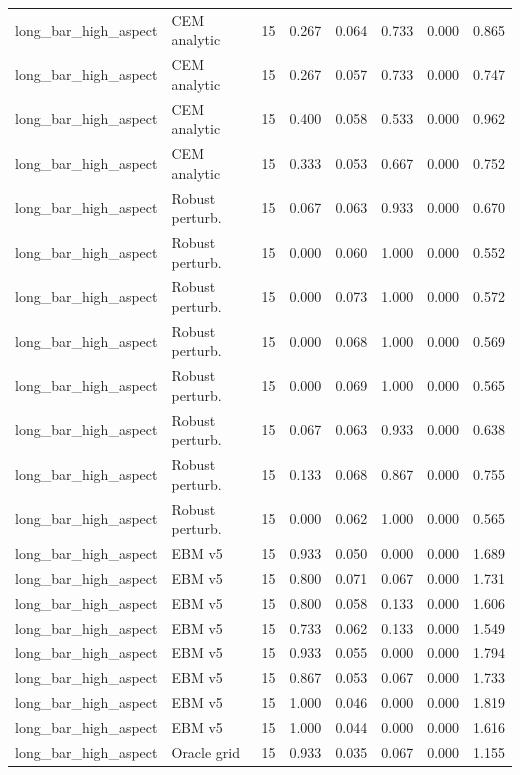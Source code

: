 {\begin{longtable}{llrrrrrr}
long\_bar\_high\_aspect & CEM analytic & 15 & 0.267 & 0.064 & 0.733 & 0.000 & 0.865 \\
long\_bar\_high\_aspect & CEM analytic & 15 & 0.267 & 0.057 & 0.733 & 0.000 & 0.747 \\
long\_bar\_high\_aspect & CEM analytic & 15 & 0.400 & 0.058 & 0.533 & 0.000 & 0.962 \\
long\_bar\_high\_aspect & CEM analytic & 15 & 0.333 & 0.053 & 0.667 & 0.000 & 0.752 \\
long\_bar\_high\_aspect & Robust perturb. & 15 & 0.067 & 0.063 & 0.933 & 0.000 & 0.670 \\
long\_bar\_high\_aspect & Robust perturb. & 15 & 0.000 & 0.060 & 1.000 & 0.000 & 0.552 \\
long\_bar\_high\_aspect & Robust perturb. & 15 & 0.000 & 0.073 & 1.000 & 0.000 & 0.572 \\
long\_bar\_high\_aspect & Robust perturb. & 15 & 0.000 & 0.068 & 1.000 & 0.000 & 0.569 \\
long\_bar\_high\_aspect & Robust perturb. & 15 & 0.000 & 0.069 & 1.000 & 0.000 & 0.565 \\
long\_bar\_high\_aspect & Robust perturb. & 15 & 0.067 & 0.063 & 0.933 & 0.000 & 0.638 \\
long\_bar\_high\_aspect & Robust perturb. & 15 & 0.133 & 0.068 & 0.867 & 0.000 & 0.755 \\
long\_bar\_high\_aspect & Robust perturb. & 15 & 0.000 & 0.062 & 1.000 & 0.000 & 0.565 \\
long\_bar\_high\_aspect & EBM v5 & 15 & 0.933 & 0.050 & 0.000 & 0.000 & 1.689 \\
long\_bar\_high\_aspect & EBM v5 & 15 & 0.800 & 0.071 & 0.067 & 0.000 & 1.731 \\
long\_bar\_high\_aspect & EBM v5 & 15 & 0.800 & 0.058 & 0.133 & 0.000 & 1.606 \\
long\_bar\_high\_aspect & EBM v5 & 15 & 0.733 & 0.062 & 0.133 & 0.000 & 1.549 \\
long\_bar\_high\_aspect & EBM v5 & 15 & 0.933 & 0.055 & 0.000 & 0.000 & 1.794 \\
long\_bar\_high\_aspect & EBM v5 & 15 & 0.867 & 0.053 & 0.067 & 0.000 & 1.733 \\
long\_bar\_high\_aspect & EBM v5 & 15 & 1.000 & 0.046 & 0.000 & 0.000 & 1.819 \\
long\_bar\_high\_aspect & EBM v5 & 15 & 1.000 & 0.044 & 0.000 & 0.000 & 1.616 \\
long\_bar\_high\_aspect & Oracle grid & 15 & 0.933 & 0.035 & 0.067 & 0.000 & 1.155 \\

\end{longtable}}
